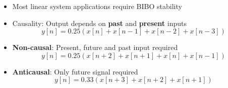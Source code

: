 \documentclass[conference]{IEEEtran}
\begin{document}
\begin{itemize}
  \item Most linear system applications require BIBO stability
  
  \item Causality: Output depends on \textbf{past} and \textbf{present} inputs
  $$
    y[n] = 0.25(x[n] + x[n - 1] + x[n - 2] + x[n - 3])
  $$

  \item \textbf{Non-causal}: Present, future and past input required
  $$
    y[n] = 0.25(x[n + 2] + x[n + 1] + x[n] + x[n - 1])
  $$

  \item \textbf{Anticausal}: Only future signal required 
  $$
    y[n] = 0.33(x[n + 3] + x[n + 2] + x[n + 1])
  $$
\end{itemize}










\end{document}
